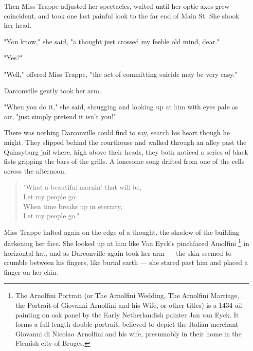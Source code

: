   Then Miss Trappe adjusted her spectacles, waited until her optic axes grew
coincident, and took one last painful look to the far end of Main St. She shook
her head.

  "You know," she said, "a thought just crossed my feeble 
old mind, dear."

  "Yes?"

  "Well," offered Miss Trappe, "the act of committing suicide may be very easy."

  Darconville gently took her arm.

  "When you do it," she said, shrugging and looking up at him with eyes pale as
air, "just simply pretend it isn't you!"

  There was nothing Darconville could find to say, search his heart though he
might. They slipped behind the courthouse and walked through an alley past the
Quinsyburg jail where, high above their heads, they both noticed a series of
black fists gripping the bars of the grills. A lonesome song drifted from one of
the cells across the afternoon.
 
\begin{verse}
      "What a beautiful mornin' that will be,  \\
      \hspace{2em}    Let my people go;  \\
      When time breaks up in eternity,  \\
      \hspace{2em}    Let my people go."
\end{verse}
 
  Miss Trappe halted again on the edge of a thought, the shadow of the building
darkening her face. She looked up at him like Van Eyck's pinchfaced Amolfini 
\footnote{ The Arnolfini Portrait (or The Arnolfini Wedding, The Arnolfini
Marriage, the Portrait of Giovanni Arnolfini and his Wife, or other titles) is a
1434 oil painting on oak panel by the Early Netherlandish painter Jan van Eyck.
It forms a full-length double portrait, believed to depict the Italian merchant
Giovanni di Nicolao Arnolfini and his wife, presumably in their home in the
Flemish city of Bruges.
}
in horizontal hat, and as Darconville again took her arm --- the skin seemed to 
crumble between his fingers, like burial earth --- she stared past him and 
placed a finger on her chin.

